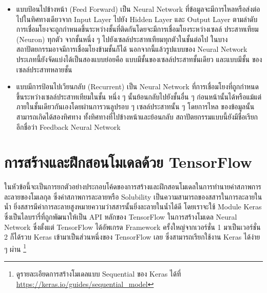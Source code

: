 \begin{itemize}
    \item แบบป้อนไปข้างหน้า (Feed Forward) เป็น Neural Network ที่ข้อมูลจะมีการไหลหรือส่งต่อไปในทิศทางเดียวจาก Input Layer 
    ไปยัง Hidden Layer และ Output Layer ตามลำดับ การเชื่อมโยงจะถูกกำหนดขึ้นระหว่างชั้นที่ติดกันโดยจะมีการเชื่อมโยงระหว่างเซลล์%
    ประสาทเทียม (Neuron) ทุกตัว จากชั้นหนึ่ง ๆ ไปยังเซลล์ประสาทเทียมทุกตัวในชั้นต่อไป ในบางสถาปัตยกรรมอาจมีการเชื่อมโยงข้ามชั้นก็ได้ 
    นอกจากนี้แล้วรูปแบบของ Neural Network ประเภทนี้ยังจัดแบ่งได้เป็นสองแบบย่อยคือ แบบมีชั้นของเซลล์ประสาทชั้นเดียว และแบบมีชั้น%
    ของเซลล์ประสาทหลายชั้น 

    \item แบบมีการป้อนไปเวียนกลับ (Recurrent) เป็น Neural Network ที่การเชื่อมโยงที่ถูกกำหนดขึ้นระหว่างเซลล์ประสาทเทียมในชั้น%
    หนึ่ง ๆ นั้นย้อนกลับไปยังชั้นอื่น ๆ ก่อนหน้านั้นได้หรือแม้แต่ภายในชั้นเดียวกันเองโดยผ่านการวนลูปรอบ ๆ เซลล์ประสาทนั้น ๆ โดยการไหล%
    ของข้อมูลนั้นสามารถเกิดได้สองทิศทาง ทั้งทิศทางที่ไปข้างหน้าและย้อนกลับ สถาปัตยกรรมแบบนี้ยังมีชื่อเรียกอีกชื่อว่า Feedback Neural 
    Network
\end{itemize}





\section{การสร้างและฝึกสอนโมเดลด้วย TensorFlow}
\label{sec:train_tf}

ในหัวข้อนี้จะเป็นการยกตัวอย่างประกอบโค้ดของการสร้างและฝึกสอนโมเดลในการทำนายค่าสภาพการละลายของโมเลกุล ซึ่งค่าสภาพการละลายหรือ
Solubility เป็นความสามารถของสสารในการละลายในน้ำ ยิ่งสสารมีค่าการละลายสูงหมายความว่าสสารนั้นยิ่งละลายในน้ำได้ดี โดยเราจะใช้ Module 
Keras ซึ่งเป็นไลบรารี่ที่ถูกพัฒนาให้เป็น API หลักของ TensorFlow ในการสร้างโมเดล Neural Network ซึ่งตั้งแต่ TensorFlow ได้อัพเกรด 
Framework ครั้งใหญ่จากเวอร์ชั่น 1 มาเป็นเวอร์ชั่น 2 ก็ได้รวบ Keras เข้ามาเป็นส่วนหนึ่งของ TensorFlow เลย ซึ่งสามารถเรียกใช้งาน Keras 
ได้ง่าย ๆ ผ่าน \footnote{ดูรายละเอียดการสร้างโมเดลแบบ Sequential ของ Keras ได้ที่ 
\url{https://keras.io/guides/sequential_model}}

